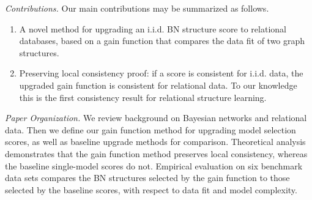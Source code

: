 \documentclass{article}
\begin{document}




\emph{Contributions.} Our main contributions may be summarized as follows.

\begin{enumerate}
\item A novel method for upgrading an i.i.d. BN structure score to relational databases, based on a gain function that compares the %
data fit of two graph structures.
\item Preserving local consistency proof: if a score is consistent for i.i.d. data, the upgraded gain function is consistent for relational data. To our knowledge this is the first consistency result for relational structure learning.
\end{enumerate}


\emph{Paper Organization.} We review background on Bayesian networks and relational data. Then we define our gain function method for upgrading model selection scores, as well as baseline upgrade methods for comparison. Theoretical analysis demonstrates that the gain function method preserves local consistency, whereas the baseline single-model scores do not.  Empirical evaluation on six benchmark data sets compares the BN structures selected by the  gain function to those selected by the baseline scores, with respect to data fit and model complexity. 
\end{document}
